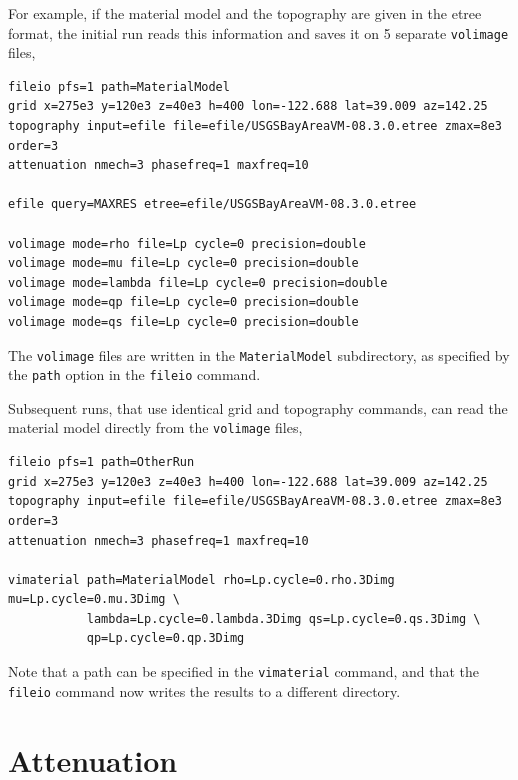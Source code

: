 \documentclass[11pt]{report}
\begin{document}
For example, if the material model and the topography are given in the etree format, the initial run
reads this information and saves it on 5 separate \verb+volimage+ files,
\begin{verbatim}
fileio pfs=1 path=MaterialModel
grid x=275e3 y=120e3 z=40e3 h=400 lon=-122.688 lat=39.009 az=142.25
topography input=efile file=efile/USGSBayAreaVM-08.3.0.etree zmax=8e3 order=3
attenuation nmech=3 phasefreq=1 maxfreq=10

efile query=MAXRES etree=efile/USGSBayAreaVM-08.3.0.etree 

volimage mode=rho file=Lp cycle=0 precision=double
volimage mode=mu file=Lp cycle=0 precision=double
volimage mode=lambda file=Lp cycle=0 precision=double
volimage mode=qp file=Lp cycle=0 precision=double
volimage mode=qs file=Lp cycle=0 precision=double
\end{verbatim}
The \verb+volimage+ files are written in the \verb+MaterialModel+ subdirectory, as specified by the
\verb+path+ option in the \verb+fileio+ command.

Subsequent runs, that use identical grid and topography commands, can read the material
model directly from the \verb+volimage+ files,
\begin{verbatim}
fileio pfs=1 path=OtherRun
grid x=275e3 y=120e3 z=40e3 h=400 lon=-122.688 lat=39.009 az=142.25
topography input=efile file=efile/USGSBayAreaVM-08.3.0.etree zmax=8e3 order=3
attenuation nmech=3 phasefreq=1 maxfreq=10

vimaterial path=MaterialModel rho=Lp.cycle=0.rho.3Dimg mu=Lp.cycle=0.mu.3Dimg \
           lambda=Lp.cycle=0.lambda.3Dimg qs=Lp.cycle=0.qs.3Dimg \
           qp=Lp.cycle=0.qp.3Dimg
\end{verbatim}
Note that a path can be specified in the \verb+vimaterial+ command, and that the \verb+fileio+
command now writes the results to a different directory.


\chapter{Attenuation}\label{sec:attenuation}
\index{attenuation}
\end{document}
